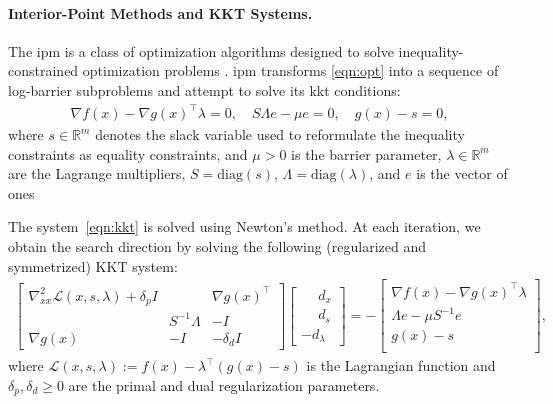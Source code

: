 \documentclass{article}
\begin{document}
\paragraph{Interior-Point Methods and KKT Systems.}
The \gls*{ipm} is a class of optimization algorithms designed to solve inequality-constrained optimization problems \cite{nocedalNumericalOptimization2006}. \gls{ipm} transforms \cref{eqn:opt} into a sequence of log-barrier subproblems and attempt to solve its \gls*{kkt} conditions:
\begin{align}\label{eqn:kkt}
  \nabla f(x) - \nabla g(x)^\top \lambda = 0, \quad
  S \Lambda e - \mu e = 0, \quad
  g(x) - s = 0,
\end{align}
where $s \in \mathbb{R}^m$ denotes the slack variable used to reformulate the inequality constraints
as equality constraints, and $\mu > 0$ is the barrier parameter, $\lambda \in \mathbb{R}^m$ are the Lagrange multipliers, $S = \text{diag}(s)$, $\Lambda = \text{diag}(\lambda)$, and $e$ is the vector of ones

The system~\eqref{eqn:kkt} is solved using Newton's method.
At each iteration, we obtain the search direction by solving the following (regularized and symmetrized) KKT system:
\begin{align}\label{eqn:kkt_system}
  \begin{bmatrix}
    \nabla^2_{x x} \mathcal{L}(x,s,\lambda) + \delta_p I & & \nabla g(x)^\top
    \\ & S^{-1}\Lambda &  -I
    \\ \nabla g(x) & -I &  - \delta_d I
  \end{bmatrix}
  \begin{bmatrix}
    \phantom{-}d_x \\
    \phantom{-}d_s \\
    -d_\lambda
  \end{bmatrix} =
  -\begin{bmatrix}
    \nabla f(x) - \nabla g(x)^\top \lambda\\
     \Lambda e - \mu S^{-1}e \\
    g(x) - s\\
  \end{bmatrix},
\end{align}
where $\mathcal{L}(x,s,\lambda) := f(x) - \lambda^\top (g(x)-s)$ is the Lagrangian function and $\delta_p, \delta_d \geq 0$ are the primal and dual regularization parameters.
\end{document}
